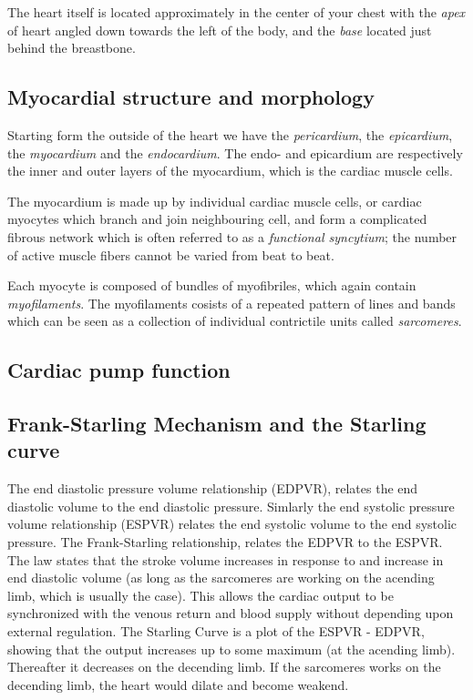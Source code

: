The heart itself is located approximately in the center of your chest
with the \emph{apex} of heart angled down towards the left of the
body, and the \emph{base} located just behind the breastbone.



\subsection{Myocardial structure and morphology}

Starting form the outside of the heart we have the \emph{pericardium},
the \emph{epicardium}, the \emph{myocardium} and the \emph{endocardium}. 
The endo- and epicardium are respectively the inner and outer layers of the
myocardium, which is the cardiac muscle cells.

The myocardium is made up by individual cardiac muscle cells, or
cardiac myocytes which branch and join neighbouring cell, and form a
complicated fibrous network which is often referred to as a
\emph{functional syncytium}; the number of active muscle fibers cannot
be varied from beat to beat. 


Each myocyte is composed of bundles of myofibriles, which again
contain \emph{myofilaments}. The myofilaments cosists of a repeated pattern
of lines and bands which can be seen as a collection of individual
contrictile units called \emph{sarcomeres}. 

\subsection{Cardiac pump function}



\subsection{Frank-Starling Mechanism and the Starling curve} 
The end diastolic pressure volume relationship (EDPVR), relates the end
diastolic volume to the end diastolic pressure. Simlarly the end
systolic pressure volume relationship (ESPVR) relates the end systolic
volume to the end systolic pressure. The Frank-Starling relationship,
relates the EDPVR to the ESPVR. The law states that the stroke volume
increases in response to and increase in end diastolic volume (as long
as the sarcomeres are working on the acending limb, which is usually
the case). This allows the cardiac output to be synchronized with the
venous return and blood supply without depending upon external
regulation.
The Starling Curve is a plot of the ESPVR - EDPVR, showing that the
output increases up to some maximum (at the acending limb). Thereafter
it decreases on the decending limb. If the sarcomeres works on the
decending limb, the heart would dilate and become weakend.

